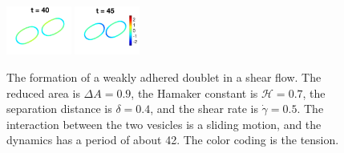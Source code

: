 \documentclass[prf,superscriptaddress,showkeys,longbibliography]{revtex4-1}
\begin{document}
\begin{figure}[htp]
  \includegraphics[width=0.19\textwidth]{figs/adR4em1adS7em1Chi5em1_ra090_image09.png}
  \includegraphics[width=0.19\textwidth]{figs/adR4em1adS7em1Chi5em1_ra090_image10.png}
  \caption{\label{fig:doublet090-weakAdhesion} The formation of a weakly
  adhered doublet in a shear flow.  The reduced area is $\Delta A =
  0.9$, the Hamaker constant is $\mathcal{H}=0.7$, the separation
  distance is $\delta = 0.4$, and the shear rate is $\dot\gamma=0.5$.
  The interaction between the two vesicles is a sliding motion, and the
  dynamics has a period of about 42.  The color coding is the tension.}
\end{figure}
\end{document}
